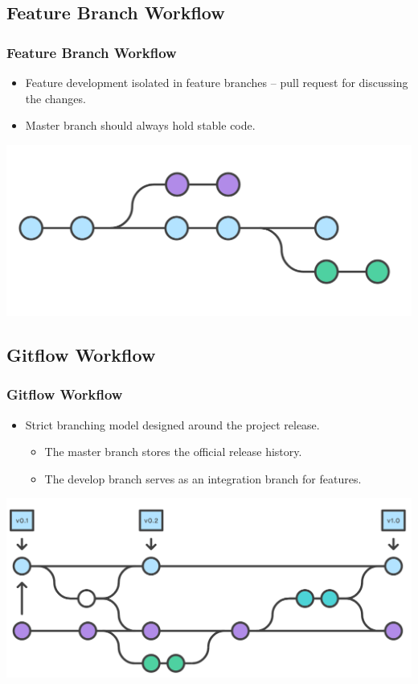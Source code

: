 \subsection[]{Feature Branch Workflow}
\begin{frame}
\frametitle{Feature Branch Workflow}
\begin{itemize}
	\item Feature development isolated in feature branches – pull request for discussing the changes.
	\item Master branch should always hold stable code.
\end{itemize}
\begin{center}
\includegraphics[width=\textwidth, height=0.42\textwidth]{feature-branch-workflow.png}
\end{center}
\end{frame}

\subsection[]{Gitflow Workflow}
\begin{frame}
\frametitle{Gitflow Workflow}
\begin{itemize}
	\item Strict branching model designed around the project release.
		\begin{itemize}
		\item The master branch stores the official release history.
		\item The develop branch serves as an integration branch for features.
		\end{itemize}
\end{itemize}
\begin{center}
\includegraphics[width=\textwidth, height=0.44\textwidth]{gitflow-workflow.png}
\end{center}
\end{frame}

